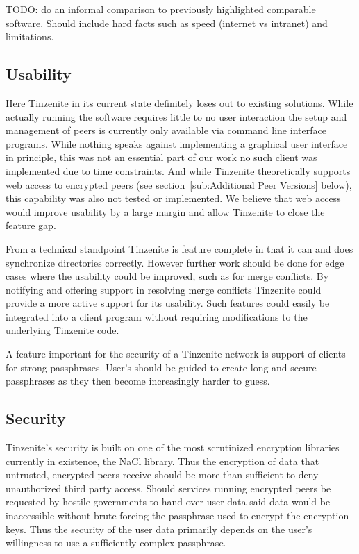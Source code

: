 TODO: do an informal comparison to previously highlighted comparable software.
Should include hard facts such as speed (internet vs intranet) and limitations.

\subsection{Usability}
\label{sub:Usability}

Here Tinzenite in its current state definitely loses out to existing solutions.
While actually running the software requires little to no user interaction the setup and management of peers is currently only available via command line interface programs.
While nothing speaks against implementing a graphical user interface in principle, this was not an essential part of our work no such client was implemented due to time constraints.
And while Tinzenite theoretically supports web access to encrypted peers (see section~\ref{sub:Additional Peer Versions} below), this capability was also not tested or implemented.
We believe that web access would improve usability by a large margin and allow Tinzenite to close the feature gap.

From a technical standpoint Tinzenite is feature complete in that it can and does synchronize directories correctly.
However further work should be done for edge cases where the usability could be improved, such as for merge conflicts.
By notifying and offering support in resolving merge conflicts Tinzenite could provide a more active support for its usability.
Such features could easily be integrated into a client program without requiring modifications to the underlying Tinzenite code.

A feature important for the security of a Tinzenite network is support of clients for strong passphrases.
User's should be guided to create long and secure passphrases as they then become increasingly harder to guess.

\subsection{Security}
\label{sub:Security}

Tinzenite's security is built on one of the most scrutinized encryption libraries currently in existence, the NaCl library.
Thus the encryption of data that untrusted, encrypted peers receive should be more than sufficient to deny unauthorized third party access.
Should services running encrypted peers be requested by hostile governments to hand over user data said data would be inaccessible without brute forcing the passphrase used to encrypt the encryption keys.
Thus the security of the user data primarily depends on the user's willingness to use a sufficiently complex passphrase.

